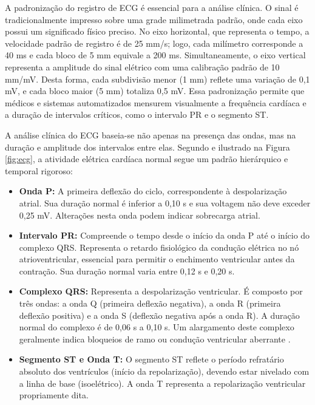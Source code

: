 \documentclass[tcc,capa]{texufpel}
\begin{document}
A padronização do registro de ECG é essencial para a análise clínica. O sinal é tradicionalmente impresso sobre uma grade milimetrada padrão, onde cada eixo possui um significado físico preciso. No eixo horizontal, que representa o tempo, a velocidade padrão de registro é de 25 mm/s; logo, cada milímetro corresponde a 40 ms e cada bloco de 5 mm equivale a 200 ms. Simultaneamente, o eixo vertical representa a amplitude do sinal elétrico com uma calibração padrão de 10 mm/mV. Desta forma, cada subdivisão menor (1 mm) reflete uma variação de 0,1 mV, e cada bloco maior (5 mm) totaliza 0,5 mV. Essa padronização permite que médicos e sistemas automatizados mensurem visualmente a frequência cardíaca e a duração de intervalos críticos, como o intervalo PR e o segmento ST.

A análise clínica do ECG baseia-se não apenas na presença das ondas, mas na duração e amplitude dos intervalos entre elas. Segundo \citet{souto2016} e ilustrado na Figura \ref{fig:ecg}, a atividade elétrica cardíaca normal segue um padrão hierárquico e temporal rigoroso:

\begin{itemize}
    \item \textbf{Onda P:} A primeira deflexão do ciclo, correspondente à despolarização atrial. Sua duração normal é inferior a 0,10 s e sua voltagem não deve exceder 0,25 mV. Alterações nesta onda podem indicar sobrecarga atrial.
    
    \item \textbf{Intervalo PR:} Compreende o tempo desde o início da onda P até o início do complexo QRS. Representa o retardo fisiológico da condução elétrica no nó atrioventricular, essencial para permitir o enchimento ventricular antes da contração. Sua duração normal varia entre 0,12 s e 0,20 s.
    
    \item \textbf{Complexo QRS:} Representa a despolarização ventricular. É composto por três ondas: a onda Q (primeira deflexão negativa), a onda R (primeira deflexão positiva) e a onda S (deflexão negativa após a onda R). A duração normal do complexo é de 0,06 s a 0,10 s. Um alargamento deste complexo geralmente indica bloqueios de ramo ou condução ventricular aberrante \cite{souto2016}.
    
    \item \textbf{Segmento ST e Onda T:} O segmento ST reflete o período refratário absoluto dos ventrículos (início da repolarização), devendo estar nivelado com a linha de base (isoelétrico). A onda T representa a repolarização ventricular propriamente dita.
\end{itemize}
\end{document}
